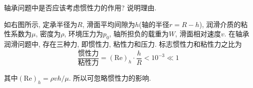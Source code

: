 \begin{problem}[14]
轴承问题中是否应该考虑惯性力的作用? 说明理由.
\end{problem}
\begin{solution}
\begin{minipage}[c]{0.8\linewidth}
如右图所示, 定承半径为$R$, 滑面平均间隙为$h$(轴的半径$r=R-h$), 润滑介质的粘性系数为$\mu$, 密度为$\rho$, 环境压力为$p_0$, 轴所担负的载重为$W$, 滑面相对速度$v$. 
在轴承润滑问题中, 存在三种力, 即惯性力, 粘性力和压力. 标志惯性力和粘性力之比为
\[
\frac{\text{惯性力}}{\text{粘性力}}=(\mathrm{Re})_h\cdot \frac{h}{R} < 10^{-3} \ll 1
\]
\end{minipage}
\begin{minipage}[c]{0.2\linewidth}
\begin{center}

\end{center}
\end{minipage}\vspace{5pt}
其中$(\mathrm{Re})_h=\rho v h/\mu$. 所以可忽略惯性力的影响.
\end{solution}
